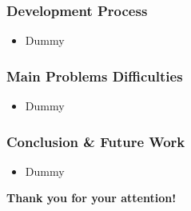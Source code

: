 \documentclass{beamer}
\begin{document}
\begin{frame}
\frametitle{Development Process}
\begin{itemize}
 \item Dummy
\end{itemize}
\end{frame}


\begin{frame}
\frametitle{Main Problems Difficulties}
\begin{itemize}
 \item Dummy
\end{itemize}
\end{frame}


\begin{frame}
\frametitle{Conclusion \& Future Work}
\begin{itemize}
 \item Dummy
\end{itemize}
\end{frame}




\begin{frame}
\begin{center}
\textbf{\LARGE Thank you for your attention!}
\end{center}

\end{frame}
\end{document}
